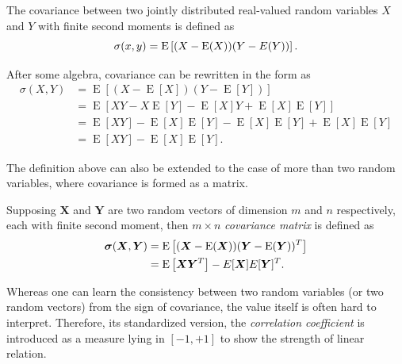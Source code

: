 \begin{defn}
The covariance between two jointly distributed real-valued random variables $ X $  and $ Y $  with finite second moments is defined as
\begin{equation}
\sigma(x,y) = \E \left [ (X-\E(X))(Y-E(Y)) \right].
\end{equation}
\end{defn}

After some algebra, covariance can be rewritten in the form as 
\begin{align}
\sigma(X,Y)
&= \operatorname{E}\left[\left(X - \operatorname{E}\left[X\right]\right) \left(Y - \operatorname{E}\left[Y\right]\right)\right] \nonumber\\
&= \operatorname{E}\left[X Y - X \operatorname{E}\left[Y\right] - \operatorname{E}\left[X\right] Y + \operatorname{E}\left[X\right] \operatorname{E}\left[Y\right]\right] \nonumber \\
&= \operatorname{E}\left[X Y\right] - \operatorname{E}\left[X\right] \operatorname{E}\left[Y\right] - \operatorname{E}\left[X\right] \operatorname{E}\left[Y\right] + \operatorname{E}\left[X\right] \operatorname{E}\left[Y\right] \nonumber \\
&= \operatorname{E}\left[X Y\right] - \operatorname{E}\left[X\right] \operatorname{E}\left[Y\right].
\end{align}

The definition above can also be extended to the case of more than two random variables, where covariance is formed as a matrix.
\begin{defn}
Supposing $ \bm{X} $ and $ \bm{Y} $ are two random vectors of dimension $ m $ and $ n $ respectively, each with finite second moment, then $ m \times n $ \textit{covariance matrix} is defined as 
\begin{align}
\bm{\sigma}(\bm{X}, \bm{Y}) &= \E \left [ (\bm{X} - \E(\bm{X}))(\bm{Y} - \E (\bm{Y}))^T \right ] \\
&= \E \left [ \bm{X} \bm{Y}^T \right ] - E[\bm{X}]E[\bm{Y}]^T.
\end{align}
\end{defn}

Whereas one can learn the consistency between two random variables (or two random vectors) from the sign of covariance, the value itself is often hard to interpret. Therefore, its standardized version, the \textit{correlation coefficient} is introduced as a measure lying in $ [-1,+1] $ to show the strength of linear relation.

